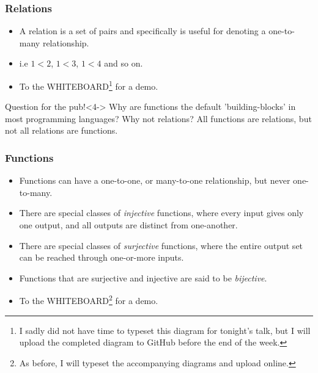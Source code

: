 \documentclass
  [hyperref={colorlinks = true,linkcolor = blue, 
             citecolor = blue, urlcolor = blue}
  ]{beamer}
\begin{document}
\begin{frame}[fragile]
\frametitle{Relations}
\begin{itemize}
  \item <1-> A relation is a set of pairs and specifically
        is useful for denoting a one-to-many relationship. 
  \item<2-> i.e $1 < 2$, $1 < 3$, $1 < 4$ and so on.
  \item<3-> To the WHITEBOARD\footnote<3->{I sadly did not have
  time to typeset this diagram for tonight's talk, but I will
  upload the completed diagram to GitHub before the end of
  the week.} for a demo.
\end{itemize}

\begin{block}{Question for the pub!}<4->
Why are functions the default 'building-blocks' in most
programming languages? Why not relations? All
functions are relations, but not all relations are functions.
\end{block}

\end{frame}

\begin{frame}[fragile]
\frametitle{Functions}
  \begin{itemize}
    \item<1-> Functions can have a one-to-one, or many-to-one
          relationship, but never one-to-many.
    \item<2-> There are special classes of \textit{injective}
          functions, where every input gives only one
          output, and all outputs are distinct from
          one-another.
    \item<3-> There are special classes of \textit{surjective}
          functions, where the entire output set can be
          reached through one-or-more inputs.
    \item<4-> Functions that are surjective and injective are
          said to be \textit{bijective}.
    \item<5-> To the WHITEBOARD\footnote<5->{As before, I will
    typeset the accompanying diagrams and upload online.} for
    a demo.
  \end{itemize}
\end{frame}
\end{document}
